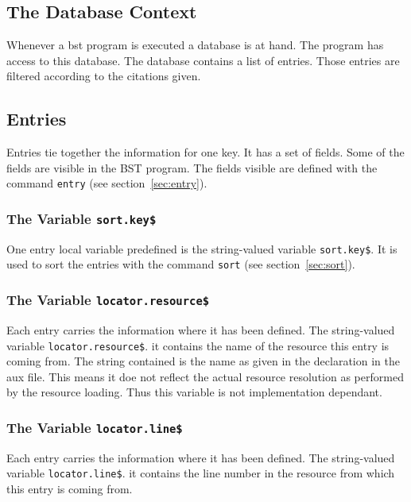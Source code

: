 \subsection{The Database Context}

Whenever a bst program is executed a database is at hand. The program
has access to this database. The database contains a list of entries.
Those entries are filtered according to the citations given.


\subsection{Entries}

Entries tie together the information for one key. It has a set of
fields. Some of the fields are visible in the BST program. The fields
visible are defined with the command \texttt{entry} (see
section~\ref{sec:entry}).


\subsubsection{The Variable \texttt{sort.key\$}}%

One entry local variable predefined is the string-valued variable
\texttt{sort.key\$}. It is used to sort the entries with the command
\texttt{sort} (see section~\ref{sec:sort}).


\subsubsection{The Variable \texttt{locator.resource\$}}%

%
Each entry carries the information where it has been defined. The
string-valued variable \texttt{locator.resource\$}. it contains the
name of the resource this entry is coming from. The string contained
is the name as given in the  declaration in the aux
file. This means it doe not reflect the actual resource resolution as
performed by the resource loading. Thus this variable is not
implementation dependant.


\subsubsection{The Variable \texttt{locator.line\$}}%

%
Each entry carries the information where it has been defined. The
string-valued variable \texttt{locator.line\$}. it contains the line
number in the resource from which this entry is coming from.


